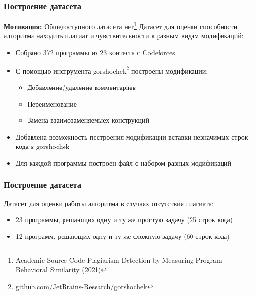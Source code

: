 \documentclass[10pt]{beamer}
\begin{document}
\begin{frame}\frametitle{Построение датасета}
	\textbf{Мотивация:} Общедоступного датасета нет\footnote[8,frame]{Academic Source Code Plagiarism Detection by Measuring Program Behavioral Similarity (2021)}
	\newline
	\newline
	Датасет для оценки способности алгоритма находить плагиат и чувствительности к разным видам модификаций:
	\begin{itemize}
		\item Собрано 372 программы из 23 контеста с Codeforces
		\item С помощью инструмента gorshochek\footnote[9,frame]{\href{https://github.com/JetBrains-Research/gorshochek}{\color{blue}github.com/JetBrains-Research/gorshochek}} построены модификации:
		\begin{itemize} 
			\item Добавление/удаление комментариев
			\item Переименование
			\item Замена взаимозаменяемыех конструкций
		\end{itemize}
		\item Добавлена возможность построения модификации вставки незначимых строк кода в gorshochek
		\item Для каждой программы построен файл с набором разных модификаций
	\end{itemize}
	
\end{frame}

\begin{frame}\frametitle{Построение датасета}
	Датасет для оценки работы алгоритма в случаях отсутствия плагиата:
	\begin{itemize}
		\item 23 программы, решающих одну и ту же простую задачу (25 строк кода)
		\item 12 программ, решающих одну и ту же сложную задачу (60 строк кода)
	\end{itemize}
	
\end{frame}
\end{document}
